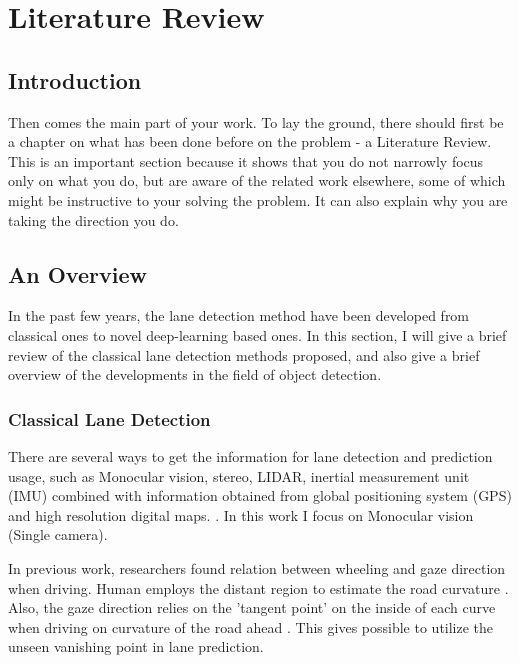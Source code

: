 
\chapter{Literature Review}
\label{cha:literature}
\begin{spacing}{1.5}
\setlength{\parskip}{0.3in}

\section{Introduction}

Then comes the main part of your work. To lay the ground, there should first be a chapter on what has been done before on the problem - a Literature Review. This is an important section because it shows that you do not narrowly focus only on what you do, but are aware of the
related work elsewhere, some of which might be instructive to your solving the problem. It can also explain why you are taking the direction you do.

\section{An Overview}
\label{sec:LR_overview}

In the past few years, the lane detection method have been developed from classical ones to novel deep-learning based ones. In this section, I will give a brief review of the classical lane detection methods proposed, and also give a brief overview of the developments in the field of object detection.

\subsection{Classical Lane Detection}

There are several ways to get the information for lane detection and prediction usage, such as Monocular vision, stereo, LIDAR, inertial measurement unit (IMU) combined with information obtained from global positioning system (GPS) and high resolution digital maps. \cite{hillel2014recent}. In this work I focus on Monocular vision (Single camera).

In previous work, researchers found relation between wheeling and gaze direction when driving. Human employs the distant region to estimate the road curvature \cite{land1995parts}. Also, the gaze direction relies on the 'tangent point' on the inside of each curve when driving on curvature of the road ahead \cite{land1994we}. This gives possible to utilize the unseen vanishing point in lane prediction.


\end{spacing}
